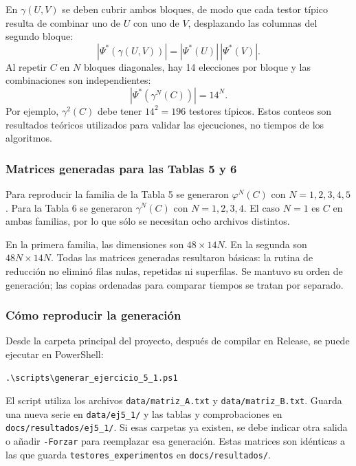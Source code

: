 En $\gamma(U,V)$ se deben cubrir ambos bloques, de modo que
cada testor típico resulta de combinar uno de $U$ con uno de
$V$, desplazando las columnas del segundo bloque:
\[
|\Psi^*(\gamma(U,V))|=|\Psi^*(U)|\,|\Psi^*(V)|.
\]
Al repetir $C$ en $N$ bloques diagonales, hay 14 elecciones
por bloque y las combinaciones son independientes:
\[
|\Psi^*(\gamma^N(C))|=14^N.
\]
Por ejemplo, $\gamma^2(C)$ debe tener $14^2=196$ testores
típicos. Estos conteos son resultados teóricos utilizados para
validar las ejecuciones, no tiempos de los algoritmos.

\subsubsection*{Matrices generadas para las Tablas 5 y 6}

Para reproducir la familia de la Tabla 5 se generaron
$\varphi^N(C)$ con $N=1,2,3,4,5$. Para la Tabla 6 se generaron
$\gamma^N(C)$ con $N=1,2,3,4$. El caso $N=1$ es $C$ en ambas
familias, por lo que sólo se necesitan ocho archivos distintos.

\begin{table}[htbp]
\centering
\small

\caption{Familia de la Tabla 5 del artículo, adaptada a nuestras
matrices $A$ y $B$. Se mantienen 48 filas y aumentan las columnas.}
\label{tab:generacionphi51}
\end{table}

\begin{table}[htbp]
\centering
\small

\caption{Familia de la Tabla 6 del artículo, adaptada a nuestras
matrices $A$ y $B$. Crecen las dimensiones y el número de testores
típicos aumenta exponencialmente.}
\label{tab:generaciongamma51}
\end{table}

En la primera familia, las dimensiones son $48\times14N$.
En la segunda son $48N\times14N$. Todas las matrices generadas
resultaron básicas: la rutina de reducción no eliminó filas
nulas, repetidas ni superfilas. Se mantuvo su orden de generación;
las copias ordenadas para comparar tiempos se tratan por separado.

\subsubsection*{Cómo reproducir la generación}

Desde la carpeta principal del proyecto, después de compilar
en Release, se puede ejecutar en PowerShell:
\begin{Verbatim}[fontsize=\small, frame=single]
.\scripts\generar_ejercicio_5_1.ps1
\end{Verbatim}
El script utiliza los archivos \texttt{data/matriz\_A.txt} y
\texttt{data/matriz\_B.txt}. Guarda una nueva serie en
\texttt{data/ej5\_1/} y las tablas y comprobaciones en
\texttt{docs/resultados/ej5\_1/}. Si esas carpetas ya existen,
se debe indicar otra salida o añadir \texttt{-Forzar} para
reemplazar esa generación. Estas matrices son idénticas a las que
guarda \texttt{testores\_experimentos} en \texttt{docs/resultados/}.

